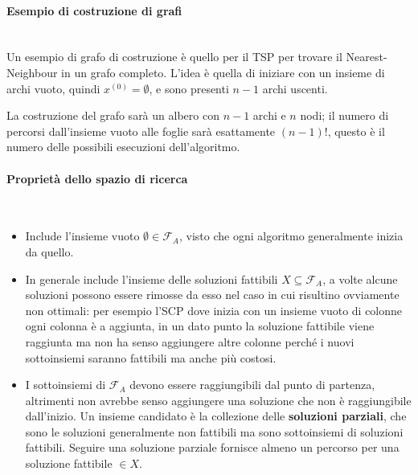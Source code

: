 \documentclass{article}
\begin{document}
    \paragraph{Esempio di costruzione di grafi}\mbox{}\\
    Un esempio di grafo di costruzione è quello per il TSP per trovare il Nearest-Neighbour in
    un grafo completo. L'idea è quella di iniziare con un insieme di archi vuoto, quindi $x^{(0)}=\emptyset$,
    e sono presenti $n-1$ archi uscenti.

    La costruzione del grafo sarà un albero con $n-1$ archi e $n$ nodi; il numero di percorsi dall'insieme
    vuoto alle foglie sarà esattamente $(n-1)!$, questo è il numero delle possibili esecuzioni
    dell'algoritmo.

    \paragraph{Proprietà dello spazio di ricerca}\mbox{}\\
    \begin{itemize}
        \item Include l'insieme vuoto $\emptyset\in\mathcal{F}_A$, visto che ogni algoritmo generalmente
              inizia da quello.

        \item In generale include l'insieme delle soluzioni fattibili $X\subseteq\mathcal{F}_A$, a volte
              alcune soluzioni possono essere rimosse da esso nel caso in cui risultino ovviamente non ottimali:
              per esempio l'SCP dove inizia con un insieme vuoto di colonne ogni colonna è a aggiunta, in un
              dato punto la soluzione fattibile viene raggiunta ma non ha senso aggiungere
              altre colonne perché i nuovi sottoinsiemi saranno fattibili ma anche più costosi.

        \item I sottoinsiemi di $\mathcal{F}_A$ devono essere raggiungibili dal punto di partenza,
              altrimenti non avrebbe senso aggiungere una soluzione che non è raggiungibile dall'inizio. Un
              insieme candidato è la collezione delle \textbf{soluzioni parziali}, che sono le soluzioni
              generalmente non fattibili ma sono sottoinsiemi di soluzioni fattibili. Seguire una soluzione
              parziale fornisce almeno un percorso per una soluzione fattibile $\in X$.

    \end{itemize}
\end{document}
